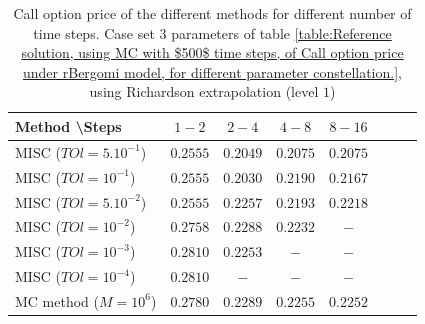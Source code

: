 \documentclass[11pt]{article}
\begin{document}
\begin{table}[h!]
\centering
\begin{tabular}{l*{6}{c}r}
Method \textbackslash  Steps    &$1-2$         & $2-4$ & $4-8$ & $8-16$\\
\hline
MISC ($TOl=5.10^{-1}$)& $0.2555$  & $0.2049$ & $0.2075$ & $0.2075$ \\
MISC ($TOl=10^{-1}$)  &$0.2555$  &$0.2030$ & $0.2190$ & $0.2167$  \\
MISC ($TOl=5.10^{-2}$)  & $0.2555$ & $0.2257$ & $0.2193$ &  $0.2218$  \\
MISC ($TOl=10^{-2}$)  & $0.2758  $ &$0.2288$ & $0.2232$ & $-$  \\

MISC ($TOl=10^{-3}$)  & $0.2810$ &$0.2253$ & $-$ & $-$  \\
MISC ($TOl=10^{-4}$)  & $0.2810$ &$-$ & $-$ & $-$  \\
\hline
MC method ($M=10^6$)  &$   0.2780$ & $0.2289$ & $ 0.2255$ & $0.2252$ \\
\hline
\end{tabular}
\caption{Call option price of the different methods for different number of time steps. Case set $3$ parameters of table \ref{table:Reference solution, using MC with $500$ time steps, of Call option price under rBergomi model, for different parameter constellation.}, using Richardson extrapolation (level $1$)}
\label{table:  Call option price of the different methods for different number of time steps. Case set $3$ parameter, using Richardson extrapolation (level $1$),linear}
\end{table}
\end{document}
